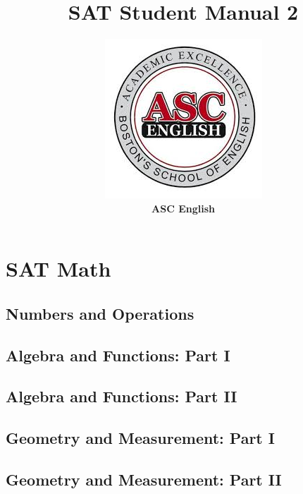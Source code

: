 \documentclass[12pt]{book}
\title{\textbf{\huge SAT Student Manual 2}}
\author{\includegraphics{logo}\\\textbf{\large ASC English}}
\date{}
\begin{document}
\maketitle


\tableofcontents


\part{SAT Math}



\chapter{Numbers and Operations}
	
	
	
	
	
	
	
	
	



\chapter{Algebra and Functions: Part I}
	
	
	
	
	

\chapter{Algebra and Functions: Part II}
	
	
	
	
	
	

\chapter{Geometry and Measurement: Part I}
	
	
	
	

\chapter{Geometry and Measurement: Part II}
	
	
	
	
\end{document}
